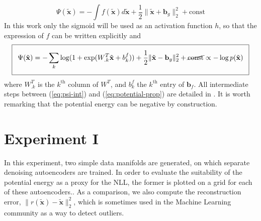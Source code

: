 \begin{equation}
\Psi(\tilde{\mathbf{x}})= -\int f(\tilde{\mathbf{x}})d\tilde{\mathbf{x}} + \frac{1}{2} \lVert \tilde{\mathbf{x}} + \textbf{b}_g \rVert_2^2 + \text{const}
\end{equation} 
In this work only the sigmoid will be used as an activation function $h$, so that the expression of $f$ can be written explicitly and
\newcommand\boxedB[1]{{\setlength\fboxsep{8pt}\boxed{#1}}}
\begin{equation}
\boxedB{\Psi(\tilde{\mathbf{x}}) =  -\sum_k \log(1 + \text{exp}(W_{.k}^T \tilde{\mathbf{x}} + b_k^f)) + \frac{1}{2} \lVert \tilde{\mathbf{x}} - \textbf{b}_g \rVert_2^2 + \cancel{\text{const}} \propto -\log p(\tilde{\mathbf{x}})}
\label{eq:potential-prop}
\end{equation}
where $W_{.k}^T$ is the $k^{\text{th}}$ column of $W^T$, and $b_k^f$ the $k^{\text{th}}$ entry of $\textbf{b}_f$. All intermediate steps between (\ref{eq:psi-int}) and (\ref{eq:potential-prop}) are detailed in \citep{potentialenergy}. It is worth remarking that the potential energy can be negative by construction. 


\section{Experiment I}\label{sec:experiment-I}
In this experiment, two simple data manifolds are generated, on which separate denoising autoencoders are trained. In order to evaluate the suitability of the potential energy as a proxy for the NLL, the former is plotted on a grid for each of these autoencoders.. As a comparison, we also compute the reconstruction error, $\lVert r(\tilde{\mathbf{x}}) - \tilde{\mathbf{x}} \rVert_2^2$, which is sometimes used in the Machine Learning community as a way to detect outliers. 
